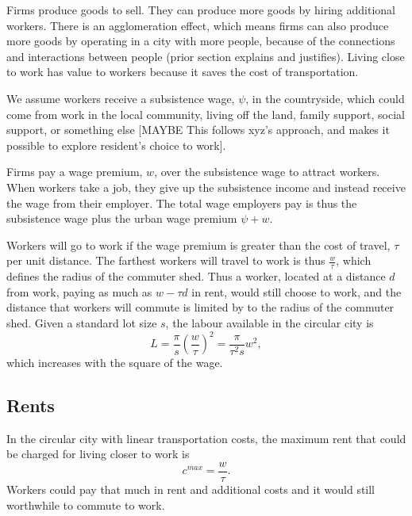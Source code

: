 Firms produce goods to sell. They can produce more goods by hiring additional workers. 
There is an agglomeration effect, which means firms can also produce more goods by operating in a city with more people, because of the connections and interactions between people (prior section explains and justifies). 
Living close to work has value to workers because it saves the cost of transportation. 

We assume workers receive a subsistence wage, $\psi$, in the countryside, which could come from work in the local community, living off the land, family support, social support, or something else [MAYBE This follows xyz's approach, and makes it possible to explore resident's choice to work]. 

Firms pay a wage premium, $w$, over the subsistence wage to attract workers. 
When workers take a job, they give up the subsistence income and instead receive the wage from their employer. 
The total wage employers pay is thus the subsistence wage plus the urban wage premium  $\psi + w$.


Workers will go to work if the wage premium is greater than the cost of travel, $\tau$ per unit distance. 
The farthest workers will travel to work is thus $\frac{w}{\tau}$, which defines the radius of the commuter shed. Thus a worker, located at a distance $d$ from work, paying as much as $w-\tau d$ in rent, would still choose to work, and the distance that workers will commute is limited by to the radius of the commuter shed. Given a standard lot size $s$, the labour available in the circular city is
\begin{equation}L%
			=\frac{\pi}{s}  \left(\frac{w}{\tau}\right)^2
			=\frac{\pi}{\tau^2 s} w^2, \label{Eqn:LabourSupply1}
	\end{equation}
which increases with the square of the wage.




\subsection{Rents}
In the circular city with linear transportation costs, the maximum rent that could be charged for living closer to work is
 \[c^{max}= \frac{w}{\tau}. \]  
 Workers could pay that much in rent and additional costs and it would still worthwhile to commute to work. 

